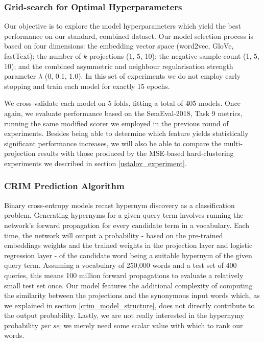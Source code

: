 \subsubsection{Grid-search for Optimal Hyperparameters}
Our objective is to explore the model hyperparameters which yield the best performance on our standard, combined dataset.  Our model selection process is based on four dimensions: the embedding vector space (word2vec, GloVe, fastText); the number of $k$ projections (1, 5, 10); the negative sample count (1, 5, 10); and the combined asymmetric and neighbour regularisation strength parameter $\lambda$ (0, 0.1, 1.0).  In this set of experiments we do not employ early stopping and train each model for exactly 15 epochs.  

We cross-validate each model on 5 folds, fitting a total of 405 models.  Once again, we evaluate performance based on the SemEval-2018, Task 9 metrics, running the same modified scorer we employed in the previous round of experiments.  Besides being able to determine which feature yields statistically significant performance increases, we will also be able to compare the multi-projection results with those produced by the \ac{MSE}-based hard-clustering experiments we described in section \ref{ustalov_experiment}.  

\subsubsection{CRIM Prediction Algorithm} \label{crim_prediction}
Binary cross-entropy models recast hypernym discovery as a classification problem.  Generating hypernyms for a given query term involves running the network's forward propagation for every candidate term in a vocabulary.  Each time, the network will output a probability - based on the pre-trained embeddings weights and the trained weights in the projection layer and logistic regression layer - of the candidate word being a suitable hypernym of the given query term.  Assuming a vocabulary of 250,000 words and a test set of 400 queries, this means 100 million forward propagations to evaluate a relatively small test set once.  Our model features the additional complexity of computing the similarity between the projections and the synonymous input words which, as we explained in section \ref{crim_model_structure}, does not directly contribute to the output probability.  Lastly, we are not really interested in the hypernymy probability \textit{per se}; we merely need some scalar value with which to rank our words.

